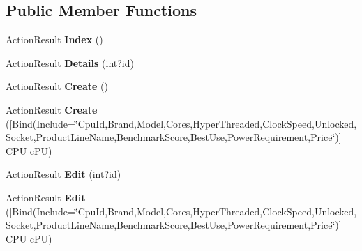 \subsection*{Public Member Functions}
\begin{DoxyCompactItemize}
\item 
Action\+Result {\bfseries Index} ()\hypertarget{class_p_c_builder_m_v_c_1_1_controllers_1_1_c_p_u_controller_aa640d493ea48a0ed025e6c2c98d083f0}{}\label{class_p_c_builder_m_v_c_1_1_controllers_1_1_c_p_u_controller_aa640d493ea48a0ed025e6c2c98d083f0}

\item 
Action\+Result {\bfseries Details} (int?id)\hypertarget{class_p_c_builder_m_v_c_1_1_controllers_1_1_c_p_u_controller_a4d6de4531fcd3eaad2980fe9741743c0}{}\label{class_p_c_builder_m_v_c_1_1_controllers_1_1_c_p_u_controller_a4d6de4531fcd3eaad2980fe9741743c0}

\item 
Action\+Result {\bfseries Create} ()\hypertarget{class_p_c_builder_m_v_c_1_1_controllers_1_1_c_p_u_controller_acd679be1eb43977d5f4b3929083cbc55}{}\label{class_p_c_builder_m_v_c_1_1_controllers_1_1_c_p_u_controller_acd679be1eb43977d5f4b3929083cbc55}

\item 
Action\+Result {\bfseries Create} (\mbox{[}Bind(Include=\char`\"{}Cpu\+Id,Brand,Model,Cores,Hyper\+Threaded,Clock\+Speed,Unlocked,Socket,Product\+Line\+Name,Benchmark\+Score,Best\+Use,Power\+Requirement,Price\char`\"{})\mbox{]} C\+PU c\+PU)\hypertarget{class_p_c_builder_m_v_c_1_1_controllers_1_1_c_p_u_controller_ac04207e76257b362078c5f18a11a7d11}{}\label{class_p_c_builder_m_v_c_1_1_controllers_1_1_c_p_u_controller_ac04207e76257b362078c5f18a11a7d11}

\item 
Action\+Result {\bfseries Edit} (int?id)\hypertarget{class_p_c_builder_m_v_c_1_1_controllers_1_1_c_p_u_controller_a3c8e98d63f6196a2e8f4e254dba66ce5}{}\label{class_p_c_builder_m_v_c_1_1_controllers_1_1_c_p_u_controller_a3c8e98d63f6196a2e8f4e254dba66ce5}

\item 
Action\+Result {\bfseries Edit} (\mbox{[}Bind(Include=\char`\"{}Cpu\+Id,Brand,Model,Cores,Hyper\+Threaded,Clock\+Speed,Unlocked,Socket,Product\+Line\+Name,Benchmark\+Score,Best\+Use,Power\+Requirement,Price\char`\"{})\mbox{]} C\+PU c\+PU)\hypertarget{class_p_c_builder_m_v_c_1_1_controllers_1_1_c_p_u_controller_a1bf99839d52ca6ad02e971feb0f0ad4b}{}\label{class_p_c_builder_m_v_c_1_1_controllers_1_1_c_p_u_controller_a1bf99839d52ca6ad02e971feb0f0ad4b}


\end{DoxyCompactItemize}
